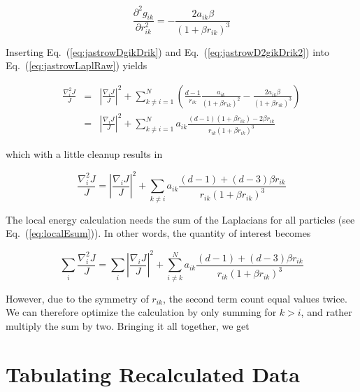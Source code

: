 \begin{equation}
\label{eq:jastrowD2gikDrik2}
 \frac{\partial^2 g_{ik}}{\partial r_{ik}^2} = -\frac{2a_{ik}\beta}{(1 + \beta r_{ik})^3}
\end{equation}

Inserting Eq.~(\ref{eq:jastrowDgikDrik}) and Eq.~(\ref{eq:jastrowD2gikDrik2}) into Eq.~(\ref{eq:jastrowLaplRaw}) yields

\begin{eqnarray}
 \frac{\nabla^2_i J}{J} &=& \left| \frac{\nabla_i J}{J}\right|^2 + \sum_{k \ne i = 1}^N \left(\frac{d-1}{r_{ik}}\frac{a_{ik}}{(1 + \beta r_{ik})^2} - \frac{2a_{ik}\beta}{(1 + \beta r_{ik})^3}\right) \nonumber\\
  &=& \left| \frac{\nabla_i J}{J}\right|^2 + \sum_{k \ne i = 1}^N a_{ik}\frac{(d-1)(1 + \beta r_{ik}) - 2\beta r_{ik}}{r_{ik}(1 + \beta r_{ik})^3} \nonumber
\end{eqnarray}

which with a little cleanup results in

\begin{equation}
 \frac{\nabla^2_i J}{J} = \left| \frac{\nabla_i J}{J}\right|^2 + \sum_{k \ne i} a_{ik}\frac{(d-1) + (d-3)\beta r_{ik}}{r_{ik}(1 + \beta r_{ik})^3}
\end{equation}

The local energy calculation needs the sum of the Laplacians for all particles (see Eq.~(\ref{eq:localEsum})). In other words, the quantity of interest becomes

\begin{equation}
 \sum_i \frac{\nabla^2_i J}{J} = \sum_i \left|\frac{\nabla_i J}{J}\right|^2 + \sum_{i \ne k}^N a_{ik}\frac{(d-1) + (d-3)\beta r_{ik}}{r_{ik}(1 + \beta r_{ik})^3}
\end{equation}

However, due to the symmetry of $r_{ik}$, the second term count equal values twice. We can therefore optimize the calculation by only summing for $k>i$, and rather multiply the sum by two. Bringing it all together, we get



\section{Tabulating Recalculated Data}

